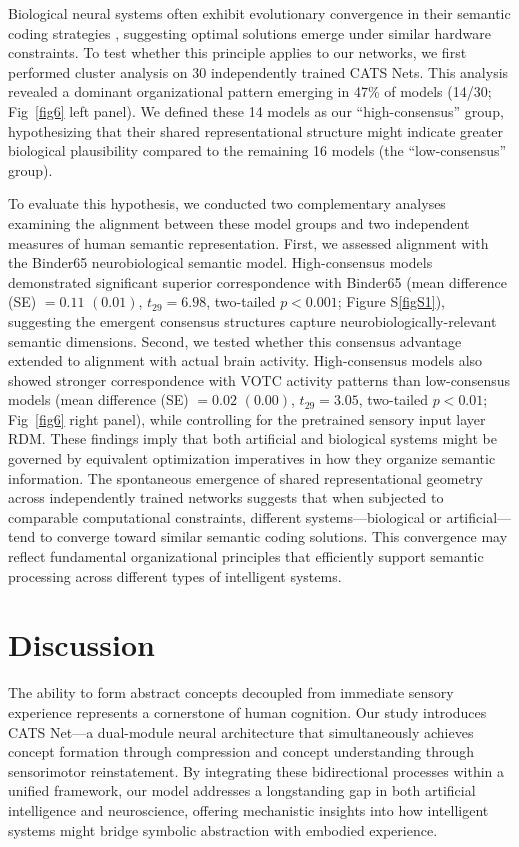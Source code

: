 \documentclass[pdflatex,sn-mathphys-num,lineno]{sn-jnl}%
\begin{document}
\begin{CJK}{UTF8}{gbsn}
Biological neural systems often exhibit evolutionary convergence in their semantic coding strategies \cite{carandini_normalization_2012}, suggesting optimal solutions emerge under similar hardware constraints. To test whether this principle applies to our networks, we first performed cluster analysis on 30 independently trained CATS Nets. This analysis revealed a dominant organizational pattern emerging in 47\% of models (14/30; Fig~\ref{fig6} left panel). We defined these 14 models as our “high-consensus” group, hypothesizing that their shared representational structure might indicate greater biological plausibility compared to the remaining 16 models (the “low-consensus” group).

To evaluate this hypothesis, we conducted two complementary analyses examining the alignment between these model groups and two independent measures of human semantic representation. First, we assessed alignment with the Binder65 neurobiological semantic model. High-consensus models demonstrated significant superior correspondence with Binder65 (mean difference (SE) $= 0.11$ $(0.01)$, $t_{29} = 6.98$, two-tailed $p < 0.001$; Figure S\ref{figS1}), suggesting the emergent consensus structures capture neurobiologically-relevant semantic dimensions. Second, we tested whether this consensus advantage extended to alignment with actual brain activity. High-consensus models also showed stronger correspondence with VOTC activity patterns than low-consensus models (mean difference (SE) $= 0.02$ $(0.00)$, $t_{29} = 3.05$, two-tailed $p < 0.01$; Fig~\ref{fig6} right panel), while controlling for the pretrained sensory input layer RDM. These findings imply that both artificial and biological systems might be governed by equivalent optimization imperatives in how they organize semantic information. The spontaneous emergence of shared representational geometry across independently trained networks suggests that when subjected to comparable computational constraints, different systems—biological or artificial— tend to converge toward similar semantic coding solutions. This convergence may reflect fundamental organizational principles that efficiently support semantic processing across different types of intelligent systems.

\section{Discussion}

The ability to form abstract concepts decoupled from immediate sensory experience represents a cornerstone of human cognition. Our study introduces CATS Net—a dual-module neural architecture that simultaneously achieves concept formation through compression and concept understanding through sensorimotor reinstatement. By integrating these bidirectional processes within a unified framework, our model addresses a longstanding gap in both artificial intelligence and neuroscience, offering mechanistic insights into how intelligent systems might bridge symbolic abstraction with embodied experience.


\end{CJK}
\end{document}
